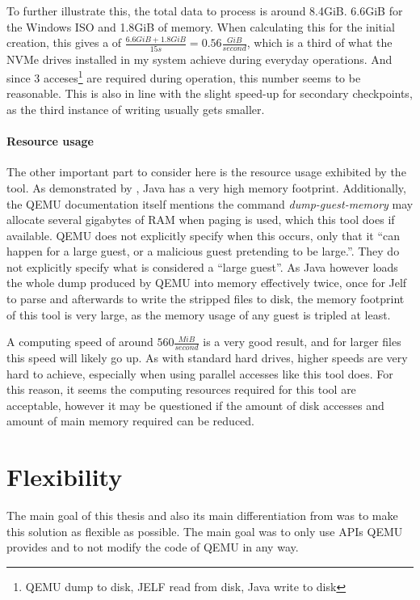 To further illustrate this, the total data to process is around 8.4GiB. 6.6GiB for the Windows ISO and 1.8GiB of memory.
When calculating this for the initial creation, this gives a  of $\frac{6.6GiB + 1.8 GiB}{15s}=0.56\frac{GiB}{second}$,
which is a third of what the NVMe drives installed in my system achieve during everyday operations.
And since 3 acceses\footnote{QEMU dump to disk, JELF read from disk, Java write to disk} are required during operation,
this number seems to be reasonable.
This is also in line with the slight speed-up for secondary checkpoints, as the third instance of writing usually gets smaller.

\paragraph{Resource usage} The other important part to consider here is the resource usage exhibited by the tool.
As demonstrated by ,
Java has a very high memory footprint\cite{Java_Performance}.
Additionally, the QEMU documentation itself mentions the command \emph{dump-guest-memory}
may allocate several gigabytes of RAM when paging is used,
which this tool does if available.
QEMU does not explicitly specify when this occurs,
only that it \enquote{can happen for a large guest, or a malicious guest pretending to be large.}\cite{qmp-commands}.
They do not explicitly specify what is considered a \enquote{large guest}.
As Java however loads the whole dump produced by QEMU into memory effectively twice,
once for Jelf to parse and afterwards to write the stripped files to disk,
the memory footprint of this tool is very large,
as the memory usage of any guest is tripled at least.

A computing speed of around $560\frac{MiB}{second}$ is a very good result,
and for larger files this speed will likely go up.
As with standard hard drives, higher speeds are very hard to achieve,
especially when using parallel accesses like this tool does.
For this reason, it seems the computing resources required for this tool are acceptable,
however it may be questioned if the amount of disk accesses
and amount of main memory required can be reduced.

\section{Flexibility}\label{sec:eval_flexibility}
The main goal of this thesis and also its main differentiation from \citeauthor{kitcheckpoints}
was to make this solution as flexible as possible.
The main goal was to only use APIs QEMU provides
and to not modify the code of QEMU in any way.

